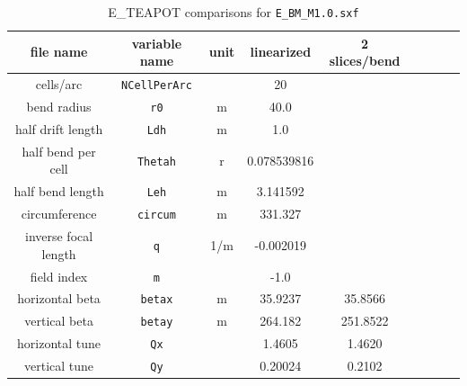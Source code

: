 \documentclass[]{article}
\begin{document}
%
\begin{table}[h]
\caption{\label{tbl:benchmarkParams.M1.0}E\_TEAPOT comparisons for {\tt E\_BM\_M1.0.sxf}
} 
\medskip
\centering
\begin{tabular}{|c|c|c|c|c|c|c|c|c|}           \hline
file name         & variable name     & unit & linearized    & 2 slices/bend &    \\ \hline
cells/arc         & {\tt NCellPerArc} &      &      20       &  &    \\
bend radius       &  {\tt r0}         &  m   &     40.0      &  &    \\
half drift length &  {\tt Ldh}        &  m   &      1.0      &  &    \\
half bend per cell & {\tt Thetah}     &  r   &   0.078539816 &  &    \\
half bend length  & {\tt Leh}         &  m   &    3.141592   &  &    \\
circumference     & {\tt circum}      &  m   &   331.327     &  &    \\
inverse focal length &  {\tt q}       & 1/m  &    -0.002019  &  &    \\ 
field index       &  {\tt m}          &      &     -1.0      &  &    \\ \hline
horizontal beta  & {\tt betax}       &  m   &    35.9237    &  35.8566 &    \\ \hline
vertical beta     & {\tt betay}       &  m   &   264.182     &  251.8522 &    \\ \hline
horizontal tune  &  {\tt Qx}         &      &     1.4605    &  1.4620 &    \\ \hline
vertical tune     &  {\tt Qy}         &      &     0.20024   &  0.2102 &    \\
\hline
\end{tabular}
\end{table}
%
\end{document}
